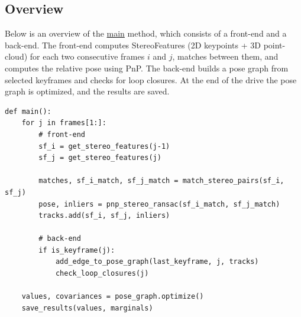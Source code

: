 \documentclass[12pt]{article}
\begin{document}
\subsection{Overview}
Below is an overview of the \href{https://github.com/ehud-gordon/VAN_ex/blob/f82a0a70011392fe57c5ac51b708a5ec6b4a7574/src/stereo_slam.py#L54}{main} method, which consists of a front-end and a back-end. The front-end computes StereoFeatures (2D keypoints + 3D point-cloud) for each two consecutive frames $i$ and $j$, matches between them, and computes the relative pose using PnP. The back-end builds a pose graph from selected keyframes and checks for loop closures. At the end of the drive the pose graph is optimized, and the results are saved.
\begin{tcolorbox} 
\begin{verbatim}
def main():
    for j in frames[1:]:
        # front-end
        sf_i = get_stereo_features(j-1)
        sf_j = get_stereo_features(j)
        
        matches, sf_i_match, sf_j_match = match_stereo_pairs(sf_i, sf_j)
        pose, inliers = pnp_stereo_ransac(sf_i_match, sf_j_match)
        tracks.add(sf_i, sf_j, inliers)
        
        # back-end
        if is_keyframe(j):
            add_edge_to_pose_graph(last_keyframe, j, tracks)
            check_loop_closures(j)    

    values, covariances = pose_graph.optimize()
    save_results(values, marginals)
\end{verbatim} 
\end{tcolorbox}
\end{document}
